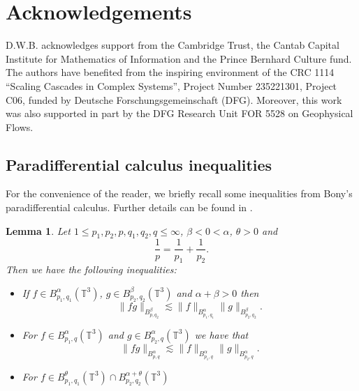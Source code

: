 \documentclass[12pt,a4paper]{article}
\newtheorem{lemma}[theorem]{Lemma}
\theoremstyle{definition}
\theoremstyle{remark}
\numberwithin{equation}{section}
\begin{document}
\section*{Acknowledgements}
D.W.B. acknowledges support from the Cambridge Trust, the Cantab Capital Institute for Mathematics of Information and the Prince Bernhard Culture fund. The authors have benefited from the inspiring environment of the CRC
1114 ``Scaling Cascades in Complex Systems'', Project Number 235221301,
Project C06, funded by Deutsche Forschungsgemeinschaft (DFG). Moreover,
this work was also supported in part by the DFG Research Unit FOR 5528 on
Geophysical Flows.
\begin{appendices}
\section{Paradifferential calculus inequalities} \label{paradifferentialappendix}
For the convenience of the reader, we briefly recall some inequalities from Bony's paradifferential calculus. Further details can be found in \cite{bahouri,boutroshydrostatic}.
\begin{lemma} \label{paraproductlemma}
Let $1 \leq p_1, p_2, p, q_1, q_2, q \leq \infty$, $\beta < 0 < \alpha$, $\theta > 0$ and
\begin{equation*}
\frac{1}{p} = \frac{1}{p_1} + \frac{1}{p_2}.
\end{equation*}
Then we have the following inequalities:
\begin{itemize}
    \item If $f \in B^\alpha_{p_1,q_1} (\mathbb{T}^3)$, $g \in B^\beta_{p_2,q_2} (\mathbb{T}^3)$ and $\alpha + \beta > 0$ then
    \begin{equation} \label{paradiffineq1}
        \lVert fg \rVert_{B^\beta_{p,q_2}} \lesssim \lVert f \rVert_{B^\alpha_{p_1,q_1}} \lVert g \rVert_{B^\beta_{p_2,q_2}}.
    \end{equation}
    \item For $f \in B^\alpha_{p_1,q} (\mathbb{T}^3)$ and $g \in B^\alpha_{p_2,q} (\mathbb{T}^3)$ we have that
    \begin{equation} \label{paradiffineq2}
        \lVert fg \rVert_{B^\alpha_{p,q}} \lesssim \lVert f \rVert_{B^\alpha_{p_1,q}} \lVert g \rVert_{B^\alpha_{p_2,q}}.
    \end{equation}
    \item For $f \in B^\theta_{p_1,q_1} (\mathbb{T}^3) \cap B^{\alpha + \theta}_{p_2,q_2} (\mathbb{T}^3)$
    \begin{equation} \label{paradiffineq3}

\end{equation}
\end{itemize}
\end{lemma}
\end{appendices}
\end{document}
